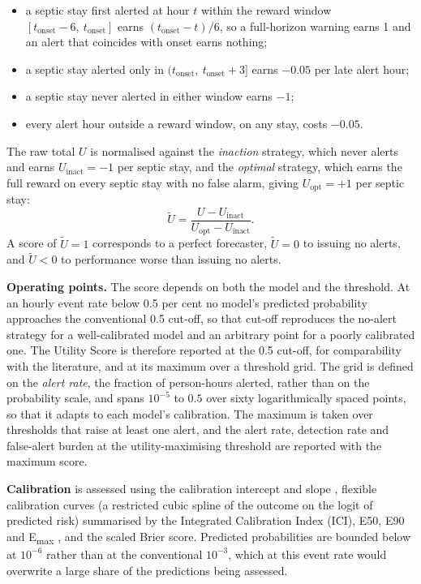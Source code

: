 \begin{itemize}
    \item a septic stay first alerted at hour $t$ within the reward window
    $[t_{\mathrm{onset}} - 6,\ t_{\mathrm{onset}}]$ earns
    $(t_{\mathrm{onset}} - t)/6$, so a full-horizon warning earns 1 and an
    alert that coincides with onset earns nothing;
    \item a septic stay alerted only in
    $(t_{\mathrm{onset}},\ t_{\mathrm{onset}} + 3]$ earns $-0.05$ per late
    alert hour;
    \item a septic stay never alerted in either window earns $-1$;
    \item every alert hour outside a reward window, on any stay, costs $-0.05$.
\end{itemize}

The raw total $U$ is normalised against the \emph{inaction} strategy, which
never alerts and earns $U_{\text{inact}} = -1$ per septic stay, and the
\emph{optimal} strategy, which earns the full reward on every septic stay with
no false alarm, giving $U_{\text{opt}} = +1$ per septic stay:
\begin{equation}
    \widetilde{U} = \frac{U - U_{\text{inact}}}
                         {U_{\text{opt}} - U_{\text{inact}}}.
    \label{eq:utility_norm}
\end{equation}
A score of $\widetilde{U} = 1$ corresponds to a perfect forecaster,
$\widetilde{U} = 0$ to issuing no alerts, and $\widetilde{U} < 0$ to
performance worse than issuing no alerts.

\textbf{Operating points.} The score depends on both the model and the
threshold. At an hourly event rate below 0.5 per cent no model's predicted
probability approaches the conventional 0.5 cut-off, so that cut-off
reproduces the no-alert strategy for a well-calibrated model and an arbitrary
point for a poorly calibrated one. The Utility Score is therefore reported at
the 0.5 cut-off, for comparability with the literature, and at its maximum
over a threshold grid. The grid is defined on the \emph{alert rate}, the
fraction of person-hours alerted, rather than on the probability scale, and
spans $10^{-5}$ to $0.5$ over sixty logarithmically spaced points, so that it
adapts to each model's calibration. The maximum is taken over thresholds that
raise at least one alert, and the alert rate, detection rate and false-alert
burden at the utility-maximising threshold are reported with the maximum
score.

\textbf{Calibration} is assessed using the calibration intercept and slope
\cite{heyard2020evaluation}, flexible calibration curves (a restricted cubic
spline of the outcome on the logit of predicted risk) summarised by the
Integrated Calibration Index (ICI), E50, E90 and E\textsubscript{max}
\cite{vancalster2019calibration}, and the scaled Brier score. Predicted
probabilities are bounded below at $10^{-6}$ rather than at the conventional
$10^{-3}$, which at this event rate would overwrite a large share of the
predictions being assessed.

